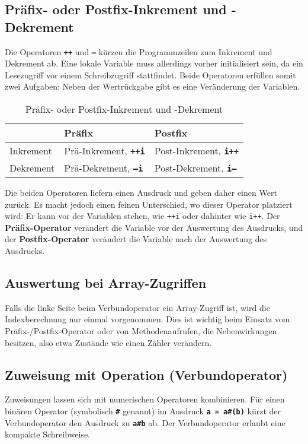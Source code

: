 \subsection{Präfix- oder Postfix-Inkrement und -Dekrement}
Die Operatoren \textbf{\texttt{++}} und \textbf{\texttt{--}} kürzen die Programmzeilen zum Inkrement und Dekrement ab. Eine lokale Variable muss allerdings vorher initialisiert sein, da ein Lesezugriff vor einem Schreibzugriff stattfindet. Beide Operatoren erfüllen somit zwei Aufgaben: Neben der Wertrückgabe gibt es eine Veränderung der Variablen.
\begin{table}[H]
\centering
\begin{tabular}{lll}
\hline
&Präfix&Postfix\\\hline
Inkrement & Prä-Inkrement, \textbf{\texttt{++i}}&Post-Inkrement, \textbf{\texttt{i++}}\\
Dekrement & Prä-Dekrement, \textbf{\texttt{--i}}&Post-Dekrement, \textbf{\texttt{i--}}\\\hline
\end{tabular}
\caption{Präfix- oder Postfix-Inkrement und -Dekrement}
\end{table}
\noindent Die beiden Operatoren liefern einen Ausdruck und geben daher einen Wert zurück. Es macht jedoch einen feinen Unterschied, wo dieser Operator platziert wird: Er kann vor der Variablen stehen, wie \texttt{++i} oder dahinter wie \texttt{i++}. Der \textbf{Präfix-Operator} verändert die Variable vor der Auswertung des Ausdrucks, und der \textbf{Postfix-Operator} verändert die Variable nach der Auswertung des Ausdrucks.

\subsection{Auswertung bei Array-Zugriffen}
Falls die linke Seite beim Verbundoperator ein Array-Zugriff ist, wird die Indexberechnung nur einmal vorgenommen. Dies ist wichtig beim Einsatz vom Präfix-/Postfix-Operator oder von Methodenaufrufen, die Nebenwirkungen besitzen, also etwa Zustände wie einen Zähler verändern.
\subsection{Zuweisung mit Operation (Verbundoperator)}
Zuweisungen lassen sich mit numerischen Operatoren kombinieren. Für einen binären Operator (symbolisch \textbf{\texttt{\#}} genannt) im Ausdruck \textbf{\texttt{a = a\#(b)}} kürzt der Verbundoperator den Ausdruck zu \textbf{\texttt{a\#b}} ab. Der Verbundoperator erlaubt eine kompakte Schreibweise.
